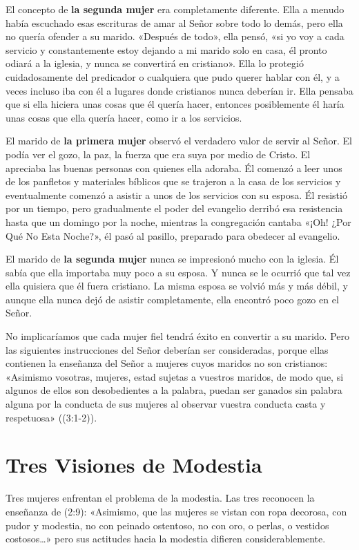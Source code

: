 \documentclass[12pt, twoside, openright]{book}
\begin{document}
El concepto de \textbf{la segunda mujer} era completamente diferente. Ella a menudo había escuchado esas escrituras de amar al Señor sobre todo lo demás, pero ella no quería ofender a su marido. «Después de todo», ella pensó, «si yo voy a cada servicio y constantemente estoy dejando a mi marido solo en casa, él pronto odiará a la iglesia, y nunca se convertirá en cristiano». Ella lo protegió cuidadosamente del predicador o cualquiera que pudo querer hablar con él, y a veces incluso iba con él a lugares donde cristianos nunca deberían ir. Ella pensaba que si ella hiciera unas cosas que él quería hacer, entonces posiblemente él haría unas cosas que ella quería hacer, como ir a los servicios. 

El marido de \textbf{la primera mujer} observó el verdadero valor de servir al Señor. El podía ver el gozo, la paz, la fuerza que era suya por medio de Cristo. El apreciaba las buenas personas con quienes ella adoraba. Él comenzó a leer unos de los panfletos y materiales bíblicos que se trajeron a la casa de los servicios y eventualmente comenzó a asistir a unos de los servicios con su esposa. Él resistió por un tiempo, pero gradualmente el poder del evangelio derribó esa resistencia hasta que un domingo por la noche, mientras la congregación cantaba «¡Oh! ¿Por Qué No Esta Noche?», él pasó al pasillo, preparado para obedecer al evangelio. 

El marido de \textbf{la segunda mujer} nunca se impresionó mucho con la iglesia. Él sabía que ella importaba muy poco a su esposa. Y nunca se le ocurrió que tal vez ella quisiera que él fuera cristiano. La misma esposa se volvió más y más débil, y aunque ella nunca dejó de asistir completamente, ella encontró poco gozo en el Señor.

No implicaríamos que cada mujer fiel tendrá éxito en convertir a su marido. Pero las siguientes instrucciones del Señor deberían ser consideradas, porque ellas contienen la enseñanza del Señor a mujeres cuyos maridos no son cristianos: «Asimismo vosotras, mujeres, estad sujetas a vuestros maridos, de modo que, si algunos de ellos son desobedientes a la palabra, puedan ser ganados sin palabra alguna por la conducta de sus mujeres al observar vuestra conducta casta y respetuosa» ((3:1-2)).

\section{Tres Visiones de Modestia}
Tres mujeres enfrentan el problema de la modestia. Las tres reconocen la enseñanza de (2:9): «Asimismo, que las mujeres se vistan con ropa decorosa, con pudor y modestia, no con peinado ostentoso, no con oro, o perlas, o vestidos costosos…» pero sus actitudes hacia la modestia difieren considerablemente. 
\end{document}
